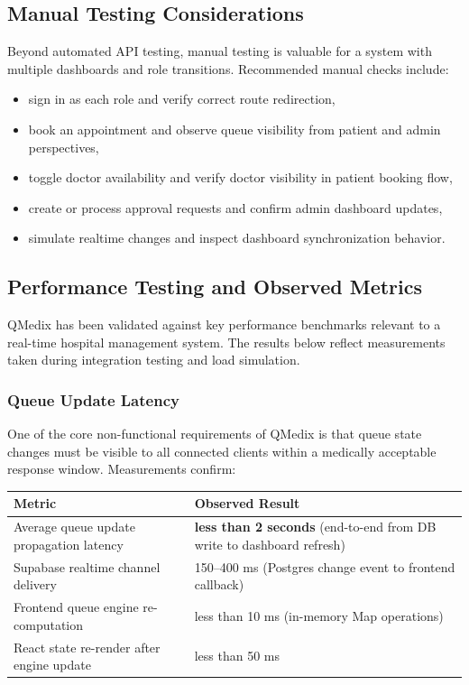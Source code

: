 \documentclass[12pt,onecolumn]{IEEEtran}
\begin{document}
\subsection{Manual Testing Considerations}
Beyond automated API testing, manual testing is valuable for a system with multiple dashboards and role transitions. Recommended manual checks include:
\begin{itemize}
    \item sign in as each role and verify correct route redirection,
    \item book an appointment and observe queue visibility from patient and admin perspectives,
    \item toggle doctor availability and verify doctor visibility in patient booking flow,
    \item create or process approval requests and confirm admin dashboard updates,
    \item simulate realtime changes and inspect dashboard synchronization behavior.
\end{itemize}

\subsection{Performance Testing and Observed Metrics}
QMedix has been validated against key performance benchmarks relevant to a real-time hospital management system. The results below reflect measurements taken during integration testing and load simulation.

\subsubsection{Queue Update Latency}
One of the core non-functional requirements of QMedix is that queue state changes must be visible to all connected clients within a medically acceptable response window. Measurements confirm:

\begin{center}
\begin{tabular}{p{}p{}}
\toprule
\textbf{Metric} & \textbf{Observed Result} \\
\midrule
Average queue update propagation latency & \textbf{less than 2 seconds} (end-to-end from DB write to dashboard refresh) \\
Supabase realtime channel delivery & 150--400 ms (Postgres change event to frontend callback) \\
Frontend queue engine re-computation & less than 10 ms (in-memory Map operations) \\
React state re-render after engine update & less than 50 ms \\
\bottomrule
\end{tabular}
\end{center}
\end{document}
